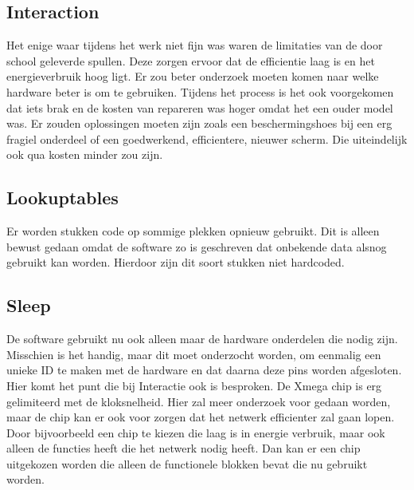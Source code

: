 \subsection{Interaction}
Het enige waar tijdens het werk niet fijn was waren de limitaties van de door school geleverde spullen. Deze zorgen ervoor dat de 
efficientie laag is en het energieverbruik hoog ligt. Er zou beter onderzoek moeten komen naar welke hardware beter is om te gebruiken.
Tijdens het process is het ook voorgekomen dat iets brak en de kosten van repareren was hoger omdat het een ouder model was. Er zouden oplossingen
moeten zijn zoals een beschermingshoes bij een erg fragiel onderdeel of een goedwerkend, efficientere, nieuwer scherm. Die uiteindelijk ook 
qua kosten minder zou zijn.

\subsection{Lookuptables}
Er worden stukken code op sommige plekken opnieuw gebruikt. Dit is alleen bewust gedaan omdat de software zo is geschreven dat onbekende 
data alsnog gebruikt kan worden. Hierdoor zijn dit soort stukken niet hardcoded.

\subsection{Sleep}
De software gebruikt nu ook alleen maar de hardware onderdelen die nodig zijn. Misschien is het handig, maar dit moet onderzocht worden, 
om eenmalig een unieke ID te maken met de hardware en dat daarna deze pins worden afgesloten. Hier komt het punt die bij Interactie ook is 
besproken. De Xmega chip is erg gelimiteerd met de kloksnelheid. Hier zal meer onderzoek voor gedaan worden, maar de chip kan er ook voor zorgen 
dat het netwerk efficienter zal gaan lopen. Door bijvoorbeeld een chip te kiezen die laag is in energie verbruik, maar ook alleen de functies heeft die 
het netwerk nodig heeft. Dan kan er een chip uitgekozen worden die alleen de functionele blokken bevat die nu gebruikt worden.